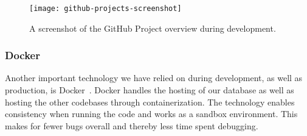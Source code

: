 \begin{figure}[h]
    \centering
    \texttt{[image: github-projects-screenshot]}
    \caption{A screenshot of the GitHub Project overview during development.
    }\label{fig:github-projects-screenshot}
\end{figure}

\subsubsection{Docker}

Another important technology we have relied on during development, as well as production, is Docker~\cite{docker2024}.
Docker handles the hosting of our database as well as hosting the other codebases through containerization.
The technology enables consistency when running the code and works as a sandbox environment.
This makes for fewer bugs overall and thereby less time spent debugging.
